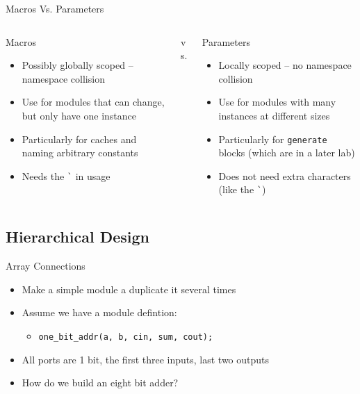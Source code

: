 \documentclass[dvipsnames]{beamer}
\begin{document}
\begin{frame}{Macros Vs. Parameters}
	\begin{columns}
		\begin{column}[T]{0.45\textwidth}
			\begin{block}{Macros}
				\begin{itemize}
					\item Possibly globally scoped -- namespace collision
					\item Use for modules that can change, but only have one
						instance
					\item Particularly for caches and naming arbitrary constants
					\item Needs the \texttt{\`{}} in usage
				\end{itemize}
			\end{block}
		\end{column}
		\begin{column}[T]{0.1\textwidth}
			\vspace*{0.3\textheight}
			\Large{vs.}
			\normalsize
		\end{column}
		\begin{column}[T]{0.45\textwidth}
			\begin{block}{Parameters}
				\begin{itemize}
					\item Locally scoped -- no namespace collision
					\item Use for modules with many instances at different sizes
					\item Particularly for \texttt{generate} blocks (which are
						in a later lab)
					\item Does not need extra characters (like the
						\texttt{\`{}})
				\end{itemize}
			\end{block}
		\end{column}
	\end{columns}
\end{frame}

\subsection{Hierarchical Design}
\begin{frame}{Array Connections}
	\begin{itemize}
		\item Make a simple module a duplicate it several times
		\item Assume we have a module defintion: 
			\begin{itemize}
				\item \texttt{one\_bit\_addr(a, b, cin, sum, cout);}
			\end{itemize}
		\item All ports are 1 bit, the first three inputs, last two outputs
		\item How do we build an eight bit adder?
	\end{itemize}
\end{frame}
\end{document}
